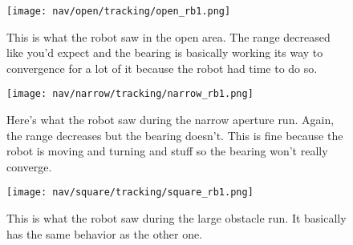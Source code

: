 \begin{figure}
  \texttt{[image: nav/open/tracking/open\_rb1.png]}
  \caption{This is what the robot saw in the open area.
           The range decreased like you'd expect and the bearing is basically working its way
           to convergence for a lot of it because the robot had time to do so.}
  \label{fig:nav_open_rb1}
\end{figure}

\begin{figure}
  \texttt{[image: nav/narrow/tracking/narrow\_rb1.png]}
  \caption{Here's what the robot saw during the narrow aperture run.
           Again, the range decreases but the bearing doesn't.
           This is fine because the robot is moving and turning and stuff so the bearing
           won't really converge.}
  \label{fig:nav_narrow_rb1}
\end{figure}

\begin{figure}
  \texttt{[image: nav/square/tracking/square\_rb1.png]}
  \caption{This is what the robot saw during the large obstacle run.
           It basically has the same behavior as the other one.}
  \label{fig:nav_square_rb1}
\end{figure}